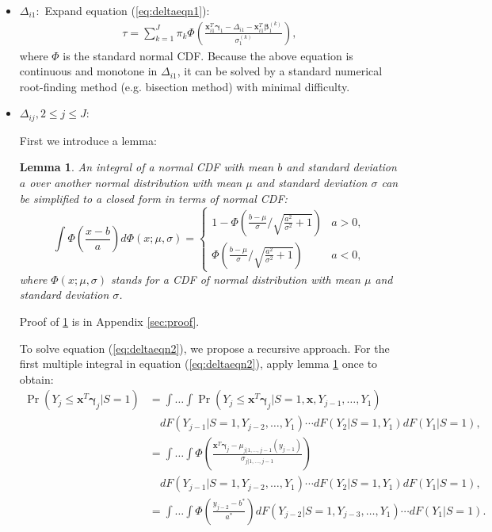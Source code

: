 \documentclass[12pt]{article}
\newtheorem{lem}[thm]{Lemma}
\DeclareMathOperator{\prob}{Pr}
\begin{document}
\begin{itemize}
\item \textbf{$\Delta_{i1}: $} Expand equation (\ref{eq:deltaeqn1}):
  \begin{align*}
    \tau = \sum_{k = 1}^J \pi_k \Phi \left( \frac{\bm x_{i1}^T \bm
        \gamma_1 - \Delta_{i1} - \bm x_{i1}^T\bm \beta_1^{(k)}}{
         \sigma_1^{(k)} } \right),
  \end{align*}
  where $\Phi$ is the standard normal CDF. Because the above equation
  is continuous and monotone in $\Delta_{i1}$, it can be solved by a
  standard numerical root-finding method (e.g. bisection method) with
  minimal difficulty.

\item \textbf{$\Delta_{ij}, 2\leq j \leq J: $}

  First we introduce a lemma:
  \begin{lem}\label{sec:lemma}
    An integral of a normal CDF with mean $b$ and standard deviation
    $a$ over another normal distribution with mean $\mu$ and standard
    deviation $\sigma$ can be simplified to a closed form in terms of
    normal CDF:
    \begin{equation}
      \label{eq:lem}
      \int \Phi \left( \frac{x-b}{a} \right) d\Phi(x; \mu, \sigma)  =
      \begin{cases}
        1- \Phi \left( \frac{b-\mu}{\sigma} \big / \sqrt{\frac{a^2}{\sigma^2}+1} \right) & a > 0, \\
        \Phi \left( \frac{b-\mu}{\sigma} \big /
          \sqrt{\frac{a^2}{\sigma^2}+1} \right) & a < 0,
      \end{cases}
    \end{equation}
    where $\Phi(x; \mu, \sigma)$ stands for a CDF of normal
    distribution with mean $\mu$ and standard deviation $\sigma$.
  \end{lem}
  Proof of \ref{sec:lemma} is in Appendix \ref{sec:proof}.

  To solve equation (\ref{eq:deltaeqn2}), we propose a recursive
  approach. For the first multiple integral in equation
  (\ref{eq:deltaeqn2}), apply lemma \ref{sec:lemma} once to obtain:
  \begin{align*}
    \prob (Y_j \leq \bm x^T \bm \gamma_j | S = 1) & = \int\dots\int
    \prob (Y_j \leq \bm x^T\bm \gamma_j | S=1, \bm x, Y_{j-1}, \ldots, Y_1)\\
    & \quad  dF(Y_{j-1}|S=1, Y_{j-2}, \ldots, Y_1) \cdots dF(Y_2|S=1, Y_1) d F (Y_1 | S = 1), \\
    & = \int\dots\int
    \Phi \left( \frac{\bm x^T \bm \gamma_j - \mu_{j|1, \ldots, j-1}(y_{j-1})}{\sigma_{j|1, \ldots, j-1}} \right) \\
    & \quad dF(Y_{j-1}|S=1, Y_{j-2}, \ldots, Y_1) \cdots dF(Y_2|S=1, Y_1) d F (Y_1 | S = 1), \\
    & = \int\dots\int \Phi \left( \frac{y_{j-2} - b^{*}}{a^{*}}
    \right) dF(Y_{j-2}|S=1, Y_{j-3}, \ldots, Y_1) \cdots d F (Y_1 | S
    = 1).
  \end{align*}


\end{itemize}
\end{document}

